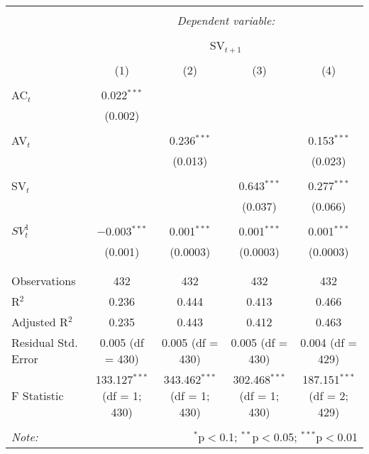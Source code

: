 
\begin{table}[!htbp] \centering 
  \caption{} 
  \label{} 
\begin{tabular}{@{\extracolsep{5pt}}lcccc} 
\\[-1.8ex]\hline 
\hline \\[-1.8ex] 
 & \multicolumn{4}{c}{\textit{Dependent variable:}} \\ 
\cline{2-5} 
\\[-1.8ex] & \multicolumn{4}{c}{SV$_{t+1}$} \\ 
\\[-1.8ex] & (1) & (2) & (3) & (4)\\ 
\hline \\[-1.8ex] 
 AC$_{t}$ & 0.022$^{***}$ &  &  &  \\ 
  & (0.002) &  &  &  \\ 
  & & & & \\ 
 AV$_{t}$ &  & 0.236$^{***}$ &  & 0.153$^{***}$ \\ 
  &  & (0.013) &  & (0.023) \\ 
  & & & & \\ 
 SV$_{t}$ &  &  & 0.643$^{***}$ & 0.277$^{***}$ \\ 
  &  &  & (0.037) & (0.066) \\ 
  & & & & \\ 
 $SV^{1}_{t}$ & $-$0.003$^{***}$ & 0.001$^{***}$ & 0.001$^{***}$ & 0.001$^{***}$ \\ 
  & (0.001) & (0.0003) & (0.0003) & (0.0003) \\ 
  & & & & \\ 
\hline \\[-1.8ex] 
Observations & 432 & 432 & 432 & 432 \\ 
R$^{2}$ & 0.236 & 0.444 & 0.413 & 0.466 \\ 
Adjusted R$^{2}$ & 0.235 & 0.443 & 0.412 & 0.463 \\ 
Residual Std. Error & 0.005 (df = 430) & 0.005 (df = 430) & 0.005 (df = 430) & 0.004 (df = 429) \\ 
F Statistic & 133.127$^{***}$ (df = 1; 430) & 343.462$^{***}$ (df = 1; 430) & 302.468$^{***}$ (df = 1; 430) & 187.151$^{***}$ (df = 2; 429) \\ 
\hline 
\hline \\[-1.8ex] 
\textit{Note:}  & \multicolumn{4}{r}{$^{*}$p$<$0.1; $^{**}$p$<$0.05; $^{***}$p$<$0.01} \\ 
\end{tabular} 
\end{table} 
